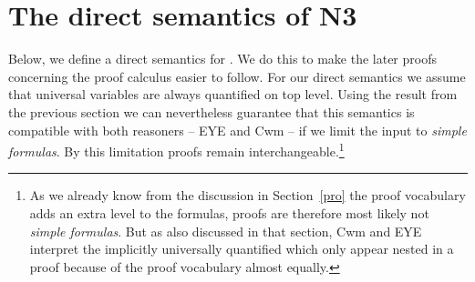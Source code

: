 \section{The direct semantics of N3}
\label{nthree}
% 
Below, we define a direct semantics for \nthree. We do this to make the later proofs concerning the proof calculus easier to follow. For our direct semantics we assume that universal variables are
always quantified on top level. Using the result from the previous section we can nevertheless guarantee that this semantics is compatible with both reasoners -- EYE and Cwm -- 
if we limit the input to \emph{simple formulas}. By this limitation proofs remain interchangeable.\footnote{As we already know from the discussion in Section~\ref{pro} the proof 
vocabulary adds an extra level to the formulas, proofs are therefore most likely not \emph{simple formulas}. But as also discussed in that section, %
Cwm and EYE interpret the implicitly universally quantified which only appear nested in a proof because of the proof vocabulary almost equally.
}


